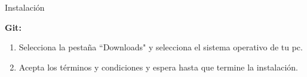 \begin{frame}[t]{Instalaci\'on}\vspace{5pt}

\textbf{Git:}

\begin{enumerate}
	\item Selecciona la pesta\~na ``Downloads" y selecciona el sistema operativo de tu pc.
	\item Acepta los t\'erminos y condiciones y espera hasta que termine la instalaci\'on.
\end{enumerate}

\end{frame}